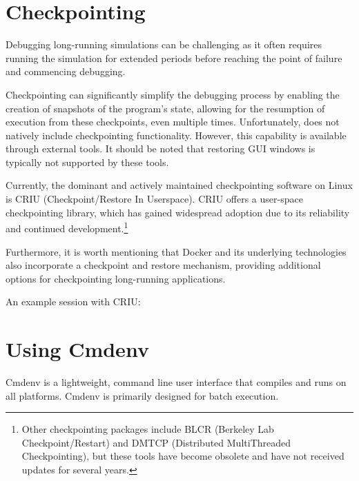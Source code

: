 \section{Checkpointing}
\label{sec:run-sim:checkpointing}

Debugging long-running simulations can be challenging as it often requires
running the simulation for extended periods before reaching the point of failure
and commencing debugging.

Checkpointing can significantly simplify the debugging process by enabling the
creation of snapshots of the program's state, allowing for the resumption of
execution from these checkpoints, even multiple times. Unfortunately, {\opp}
does not natively include checkpointing functionality. However, this capability
is available through external tools. It should be noted that restoring GUI
windows is typically not supported by these tools.

Currently, the dominant and actively maintained checkpointing software on Linux
is CRIU (Checkpoint/Restore In Userspace). CRIU offers a user-space
checkpointing library, which has gained widespread adoption due to its
reliability and continued development.\footnote{Other checkpointing packages
include BLCR (Berkeley Lab Checkpoint/Restart) and DMTCP (Distributed
MultiThreaded Checkpointing), but these tools have become obsolete and have not
received updates for several years.}

Furthermore, it is worth mentioning that Docker and its underlying technologies
also incorporate a checkpoint and restore mechanism, providing additional
options for checkpointing long-running applications.

An example session with CRIU:



\section{Using Cmdenv}
\label{sec:run-sim:cmdenv}

Cmdenv is a lightweight, command line user interface that
compiles and runs on all platforms. Cmdenv is primarily designed for batch
execution.

